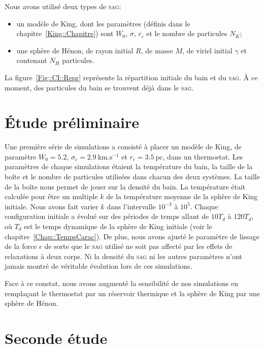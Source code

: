 	Nous avons utilisé deux types de \textsc{sag}:
	\begin{itemize}
		\item un modèle de King, dont les paramètres (définis dans le chapitre~\ref{King::Chapitre}) sont $W_0$, $\sigma$, $r_c$ et le nombre
			de particules $N_K$;
		\item une sphère de Hénon, de rayon initial $R$, de masse $M$, de viriel initial $\gamma$ et contenant $N_H$ particules.
	\end{itemize}

	La figure~\ref{Fig::CI::Repr} représente la répartition initiale du bain et du \textsc{sag}. À ce moment, des particules du bain se trouvent déjà dans le \textsc{sag}.

\section{Étude préliminaire}

	Une première série de simulations a consisté à placer un modèle de King, de paramètre $W_0 = 5.2$, $\sigma_c = 2.9\
	\mathrm{km}.\mathrm{s}^{-1}$ et $r_c = 3.5\ \mathrm{pc}$, dans un thermostat. Les paramètres de chaque simulations étaient la température du
	bain, la taille de la boîte et le nombre de particules utilisées dans chacun des deux systèmes. La taille de la boîte nous permet de jouer sur
	la densité du bain. La température était calculée pour être un multiple $k$ de la température moyenne de la sphère de King initiale. Nous
	avons fait varier $k$ dans l'intervalle $10^{-3}$ à $10^5$. Chaque configuration initiale a évolué sur des périodes de temps allant de $10T_d$
	à $120T_d$, où $T_d$ est le temps dynamique de la sphère de King initiale (voir le chapitre~\ref{Chap::TempsCarac}). De plus, nous avons
	ajusté le paramètre de lissage de la force $\epsilon$ de sorte que le \textsc{sag} utilisé ne soit pas affecté par les effets de relaxations à deux
	corps. Ni la densité du \textsc{sag} ni les autres paramètres n'ont jamais montré de véritable évolution lors de ces simulations.


	Face à ce constat, nous avons augmenté la sensibilité de nos simulations en remplaçant le thermostat par un réservoir thermique et la
	sphère de King par une sphère de Hénon.

\section{Seconde étude}


